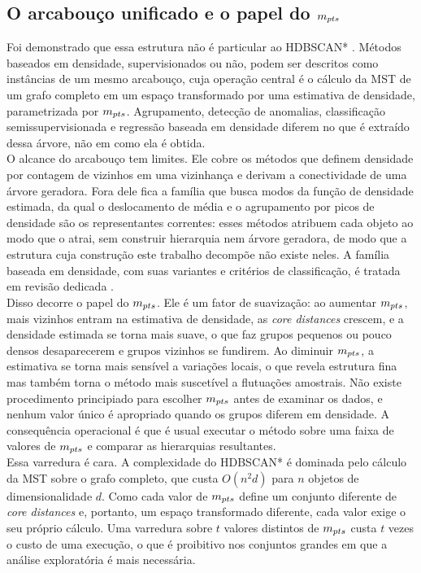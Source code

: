 \subsection{O arcabouço unificado e o papel do $m_{pts}$\label{sec:framework}}

Foi demonstrado que essa estrutura não é particular ao \ac{HDBSCAN*} \cite{framework-density-clustering}. Métodos baseados em densidade, supervisionados ou não, podem ser descritos como instâncias de um mesmo arcabouço, cuja operação central é o cálculo da \ac{MST} de um grafo completo em um espaço transformado por uma estimativa de densidade, parametrizada por $m_{pts}$. Agrupamento, detecção de anomalias, classificação semissupervisionada e regressão baseada em densidade diferem no que é extraído dessa árvore, não em como ela é obtida.\\

O alcance do arcabouço tem limites. Ele cobre os métodos que definem densidade por contagem de vizinhos em uma vizinhança e derivam a conectividade de uma árvore geradora. Fora dele fica a família que busca modos da função de densidade estimada, da qual o deslocamento de média \cite{meanshift} e o agrupamento por picos de densidade \cite{denspeaks} são os representantes correntes: esses métodos atribuem cada objeto ao modo que o atrai, sem construir hierarquia nem árvore geradora, de modo que a estrutura cuja construção este trabalho decompõe não existe neles. A família baseada em densidade, com suas variantes e critérios de classificação, é tratada em revisão dedicada \cite{density-review}.\\

Disso decorre o papel do $m_{pts}$. Ele é um fator de suavização: ao aumentar $m_{pts}$, mais vizinhos entram na estimativa de densidade, as \textit{core distances} crescem, e a densidade estimada se torna mais suave, o que faz grupos pequenos ou pouco densos desaparecerem e grupos vizinhos se fundirem. Ao diminuir $m_{pts}$, a estimativa se torna mais sensível a variações locais, o que revela estrutura fina mas também torna o método mais suscetível a flutuações amostrais. Não existe procedimento principiado para escolher $m_{pts}$ antes de examinar os dados, e nenhum valor único é apropriado quando os grupos diferem em densidade. A consequência operacional é que é usual executar o método sobre uma faixa de valores de $m_{pts}$ e comparar as hierarquias resultantes.\\

Essa varredura é cara. A complexidade do \ac{HDBSCAN*} é dominada pelo cálculo da \ac{MST} sobre o grafo completo, que custa $O(n^2 d)$ para $n$ objetos de dimensionalidade $d$. Como cada valor de $m_{pts}$ define um conjunto diferente de \textit{core distances} e, portanto, um espaço transformado diferente, cada valor exige o seu próprio cálculo. Uma varredura sobre $t$ valores distintos de $m_{pts}$ custa $t$ vezes o custo de uma execução, o que é proibitivo nos conjuntos grandes em que a análise exploratória é mais necessária.\\

